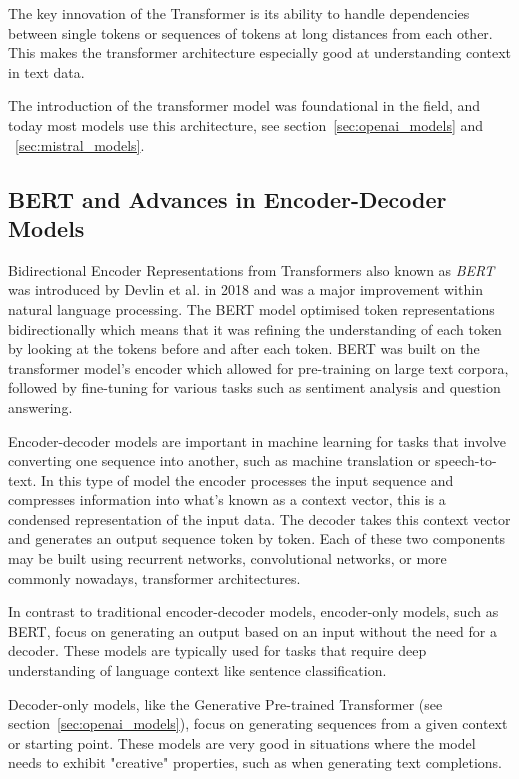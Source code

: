 The key innovation of the Transformer is its ability to handle dependencies between single tokens or sequences of tokens at long distances from each other. This makes the transformer architecture especially good at understanding context in text data.


The introduction of the transformer model was foundational in the field, and today most models use this architecture, see section~\ref{sec:openai_models} and ~\ref{sec:mistral_models}.


\subsection{BERT and Advances in Encoder-Decoder Models}
\label{sec:bert_and_encoder_decoder}


Bidirectional Encoder Representations from Transformers also known as \textit{BERT} was introduced by Devlin et al. \cite{devlin_bert_2019} in 2018 and was a major improvement within natural language processing. The BERT model optimised token representations bidirectionally which means that it was refining the understanding of each token by looking at the tokens before and after each token. BERT was built on the transformer model’s encoder which allowed for pre-training on large text corpora, followed by fine-tuning for various tasks such as sentiment analysis and question answering.


Encoder-decoder models are important in machine learning for tasks that involve converting one sequence into another, such as machine translation or speech-to-text. In this type of model the encoder processes the input sequence and compresses information into what’s known as a context vector, this is a condensed representation of the input data. The decoder takes this context vector and generates an output sequence token by token. Each of these two components may be built using recurrent networks, convolutional networks, or more commonly nowadays, transformer architectures.


In contrast to traditional encoder-decoder models, encoder-only models, such as BERT, focus on generating an output based on an input without the need for a decoder. These models are typically used for tasks that require deep understanding of language context like sentence classification.


Decoder-only models, like the Generative Pre-trained Transformer (see section~\ref{sec:openai_models}), focus on generating sequences from a given context or starting point. These models are very good in situations where the model needs to exhibit "creative" properties, such as when generating text completions.


